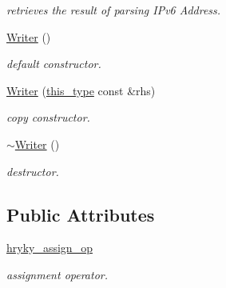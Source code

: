 \begin{DoxyCompactItemize}
\begin{DoxyCompactList}\small\item\em retrieves the result of parsing I\-Pv6 Address. \end{DoxyCompactList}\item 
\hypertarget{classhryky_1_1ip_1_1v6_1_1_writer_aea51899922e0f44970a7d54679cbf9bb}{\hyperlink{classhryky_1_1ip_1_1v6_1_1_writer_aea51899922e0f44970a7d54679cbf9bb}{Writer} ()}\label{classhryky_1_1ip_1_1v6_1_1_writer_aea51899922e0f44970a7d54679cbf9bb}

\begin{DoxyCompactList}\small\item\em default constructor. \end{DoxyCompactList}\item 
\hypertarget{classhryky_1_1ip_1_1v6_1_1_writer_a4d9d95097210a13da8c73799ed4f1ac4}{\hyperlink{classhryky_1_1ip_1_1v6_1_1_writer_a4d9d95097210a13da8c73799ed4f1ac4}{Writer} (\hyperlink{classhryky_1_1ip_1_1v6_1_1_writer_ab87fa5857b896ccb6e80da83edd48c32}{this\-\_\-type} const \&rhs)}\label{classhryky_1_1ip_1_1v6_1_1_writer_a4d9d95097210a13da8c73799ed4f1ac4}

\begin{DoxyCompactList}\small\item\em copy constructor. \end{DoxyCompactList}\item 
\hypertarget{classhryky_1_1ip_1_1v6_1_1_writer_aac3c3d01039e4c8538e7600c57087fba}{\hyperlink{classhryky_1_1ip_1_1v6_1_1_writer_aac3c3d01039e4c8538e7600c57087fba}{$\sim$\-Writer} ()}\label{classhryky_1_1ip_1_1v6_1_1_writer_aac3c3d01039e4c8538e7600c57087fba}

\begin{DoxyCompactList}\small\item\em destructor. \end{DoxyCompactList}\end{DoxyCompactItemize}
\subsection*{Public Attributes}
\begin{DoxyCompactItemize}
\item 
\hypertarget{classhryky_1_1ip_1_1v6_1_1_writer_aba58ae398bc1cbd68780b328d84d3e3a}{\hyperlink{classhryky_1_1ip_1_1v6_1_1_writer_aba58ae398bc1cbd68780b328d84d3e3a}{hryky\-\_\-assign\-\_\-op}}\label{classhryky_1_1ip_1_1v6_1_1_writer_aba58ae398bc1cbd68780b328d84d3e3a}

\begin{DoxyCompactList}\small\item\em assignment operator. \end{DoxyCompactList}\end{DoxyCompactItemize}
